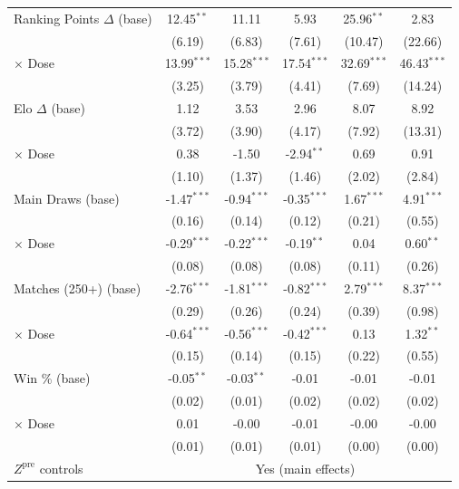 \begin{tabular}{lccccc}
\quad Ranking Points $\Delta$ (base) & 12.45$^{**}$ & 11.11 & 5.93 & 25.96$^{**}$ & 2.83 \\
 & (6.19) & (6.83) & (7.61) & (10.47) & (22.66) \\
\quad \quad $\times$ Dose & 13.99$^{***}$ & 15.28$^{***}$ & 17.54$^{***}$ & 32.69$^{***}$ & 46.43$^{***}$ \\
 & (3.25) & (3.79) & (4.41) & (7.69) & (14.24) \\[0.3em]
\quad Elo $\Delta$ (base) & 1.12 & 3.53 & 2.96 & 8.07 & 8.92 \\
 & (3.72) & (3.90) & (4.17) & (7.92) & (13.31) \\
\quad \quad $\times$ Dose & 0.38 & -1.50 & -2.94$^{**}$ & 0.69 & 0.91 \\
 & (1.10) & (1.37) & (1.46) & (2.02) & (2.84) \\[0.3em]
\quad Main Draws (base) & -1.47$^{***}$ & -0.94$^{***}$ & -0.35$^{***}$ & 1.67$^{***}$ & 4.91$^{***}$ \\
 & (0.16) & (0.14) & (0.12) & (0.21) & (0.55) \\
\quad \quad $\times$ Dose & -0.29$^{***}$ & -0.22$^{***}$ & -0.19$^{**}$ & 0.04 & 0.60$^{**}$ \\
 & (0.08) & (0.08) & (0.08) & (0.11) & (0.26) \\[0.3em]
\quad Matches (250+) (base) & -2.76$^{***}$ & -1.81$^{***}$ & -0.82$^{***}$ & 2.79$^{***}$ & 8.37$^{***}$ \\
 & (0.29) & (0.26) & (0.24) & (0.39) & (0.98) \\
\quad \quad $\times$ Dose & -0.64$^{***}$ & -0.56$^{***}$ & -0.42$^{***}$ & 0.13 & 1.32$^{**}$ \\
 & (0.15) & (0.14) & (0.15) & (0.22) & (0.55) \\[0.3em]
\quad Win \% (base) & -0.05$^{**}$ & -0.03$^{**}$ & -0.01 & -0.01 & -0.01 \\
 & (0.02) & (0.01) & (0.02) & (0.02) & (0.02) \\
\quad \quad $\times$ Dose & 0.01 & -0.00 & -0.01 & -0.00 & -0.00 \\
 & (0.01) & (0.01) & (0.01) & (0.00) & (0.00) \\[0.3em]
\midrule
$Z^{\text{pre}}$ controls & \multicolumn{5}{c}{Yes (main effects)} \\
\bottomrule
\end{tabular}
